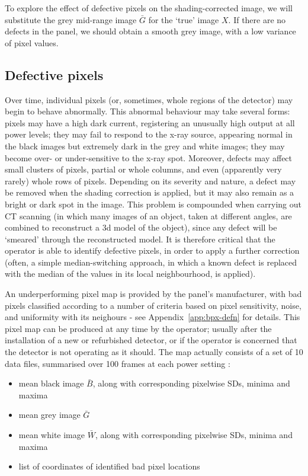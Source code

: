 \documentclass[\main/IO-Pixels.tex]{subfiles}
\begin{document}
To explore the effect of defective pixels on the shading-corrected image, we will substitute the grey mid-range image $\bar{G}$ for the `true' image $X$. If there are no defects in the panel, we should obtain a smooth grey image, with a low variance of pixel values.

\subsection{Defective pixels}

Over time, individual pixels (or, sometimes, whole regions of the detector) may begin to behave abnormally. This abnormal behaviour may take several forms: pixels may have a high dark current, registering an unusually high output at all power levels; they may fail to respond to the x-ray source, appearing normal in the black images but extremely dark in the grey and white images; they may become over- or under-sensitive to the x-ray spot. Moreover, defects may affect small clusters of pixels, partial or whole columns, and even (apparently very rarely) whole rows of pixels. Depending on its severity and nature, a defect may be removed when the shading correction is applied, but it may also remain as a bright or dark spot in the image. This problem is compounded when carrying out CT scanning (in which many images of an object, taken at different angles, are combined to reconstruct a 3d model of the object), since any defect will be `smeared' through the reconstructed model. It is therefore critical that the operator is able to identify defective pixels, in order to apply a further correction (often, a simple median-switching approach, in which a known defect is replaced with the median of the values in its local neighbourhood, is applied).

An underperforming pixel map is provided by the panel's manufacturer, with bad pixels classified according to a number of criteria based on pixel sensitivity, noise, and uniformity with its neighours - see Appendix~\ref{app:bpx-defn} for details. This pixel map can be produced at any time by the operator; usually after the installation of a new or refurbished detector, or if the operator is concerned that the detector is not operating as it should. The map actually consists of a set of 10 data files, summarised over 100 frames at each power setting :

\begin{itemize}
    \item mean black image $\bar{B}$, along with corresponding pixelwise SDs, minima and maxima
    \vspace{- .8\baselineskip}
    \item mean grey image $\bar{G}$
    \vspace{- .8\baselineskip}
    \item mean white image $\bar{W}$, along with corresponding pixelwise SDs, minima and maxima
    \vspace{- .8\baselineskip}
    \item list of coordinates of identified bad pixel locations
\end{itemize}
\end{document}
